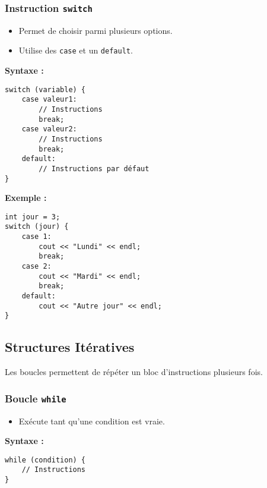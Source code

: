 \subsubsection{ Instruction \texttt{switch}}
\begin{itemize}
    \item Permet de choisir parmi plusieurs options.
    \item Utilise des \texttt{case} et un \texttt{default}.
\end{itemize}

\textbf{Syntaxe :}
\begin{tcolorbox}[colframe=blue!50!black, colback=blue!5!white, title=Syntaxe de l'Instruction switch]
\begin{verbatim}
switch (variable) {
    case valeur1:
        // Instructions
        break;
    case valeur2:
        // Instructions
        break;
    default:
        // Instructions par défaut
}
\end{verbatim}
\end{tcolorbox}

\textbf{Exemple :}
\begin{tcolorbox}[colframe=blue!50!black, colback=blue!5!white, title=Exemple de l'Instruction switch]
\begin{verbatim}
int jour = 3;
switch (jour) {
    case 1:
        cout << "Lundi" << endl;
        break;
    case 2:
        cout << "Mardi" << endl;
        break;
    default:
        cout << "Autre jour" << endl;
}
\end{verbatim}
\end{tcolorbox}

\subsection{ Structures Itératives}
Les boucles permettent de répéter un bloc d'instructions plusieurs fois.

\subsubsection{ Boucle \texttt{while}}
\begin{itemize}
    \item Exécute tant qu'une condition est vraie.
\end{itemize}

\textbf{Syntaxe :}
\begin{tcolorbox}[colframe=blue!50!black, colback=blue!5!white, title=Syntaxe de la Boucle while]
\begin{verbatim}
while (condition) {
    // Instructions
}
\end{verbatim}
\end{tcolorbox}

